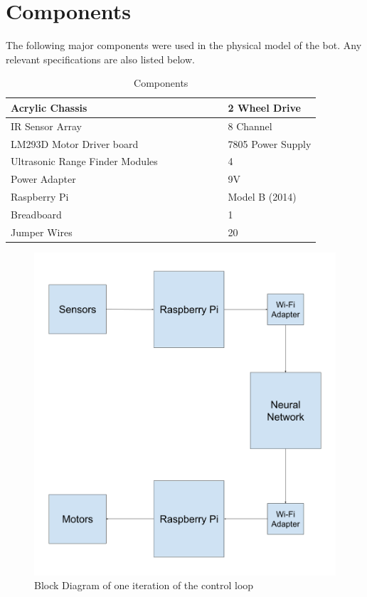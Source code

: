 \documentclass[12pt]{extreport}
\theoremstyle{plain}
\theoremstyle{definition}
\begin{document}
\section{Components}
The following major components were used in the physical model of the bot. Any relevant specifications are also listed below.

\begin{table}[h]
\centering
\begin{tabular}{|p{0.7\linewidth}|p{0.3\linewidth}|}
\hline
 Acrylic Chassis & 2 Wheel Drive \\ \hline
 IR Sensor Array & 8 Channel \\ \hline
 LM293D Motor Driver board & 7805 Power Supply \\ \hline
 Ultrasonic Range Finder Modules & 4 \\ \hline
 Power Adapter & 9V \\ \hline
 Raspberry Pi & Model B (2014)\\ \hline
 Breadboard & 1 \\ \hline
 Jumper Wires & 20 \\ \hline
\end{tabular}
\caption{Components}
\end{table}

\begin{figure}
    \includegraphics[width=\textwidth]{block-diagram}
    \caption{Block Diagram of one iteration of the control loop}
\end{figure}
\end{document}
